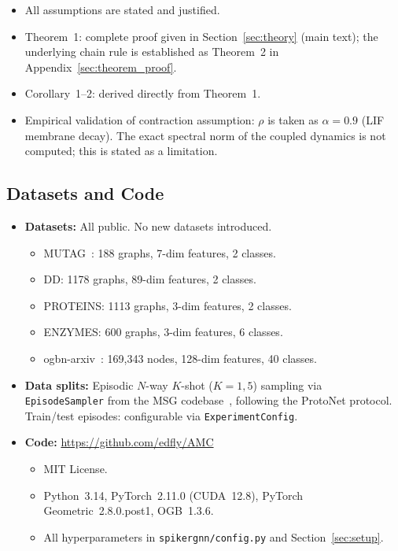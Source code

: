 \documentclass[a4paper,fleqn]{cas-dc}
\begin{document}
\begin{itemize}
    \item[\checkmark] All assumptions are stated and justified.
    \item[\checkmark] Theorem~1: complete proof given in Section~\ref{sec:theory} (main text); the underlying chain rule is established as Theorem~2 in Appendix~\ref{sec:theorem_proof}.
    \item[\checkmark] Corollary~1--2: derived directly from Theorem~1.
    \item[-] Empirical validation of contraction assumption: $\rho$ is taken as $\alpha=0.9$ (LIF membrane decay). The exact spectral norm of the coupled dynamics is not computed; this is stated as a limitation.
\end{itemize}

\subsection*{Datasets and Code}

\begin{itemize}
    \item \textbf{Datasets:} All public. No new datasets introduced.
    \begin{itemize}
        \item MUTAG~\citep{MUTAG}: 188 graphs, 7-dim features, 2 classes.
        \item DD: 1178 graphs, 89-dim features, 2 classes.
        \item PROTEINS: 1113 graphs, 3-dim features, 2 classes.
        \item ENZYMES: 600 graphs, 3-dim features, 6 classes.
        \item ogbn-arxiv~\citep{hu2020open}: 169,343 nodes, 128-dim features, 40 classes.
    \end{itemize}
    \item \textbf{Data splits:} Episodic $N$-way $K$-shot ($K{=}1{,}5$) sampling via \texttt{EpisodeSampler} from the MSG codebase~\citep{Sun24MSG}, following the ProtoNet protocol. Train/test episodes: configurable via \texttt{ExperimentConfig}.
    \item \textbf{Code:} \url{https://github.com/edfly/AMC}
    \begin{itemize}
        \item MIT License.
        \item Python~3.14, PyTorch~2.11.0 (CUDA~12.8), PyTorch Geometric~2.8.0.post1, OGB~1.3.6.
        \item All hyperparameters in \texttt{spikergnn/config.py} and Section~\ref{sec:setup}.
    \end{itemize}
\end{itemize}
\end{document}
